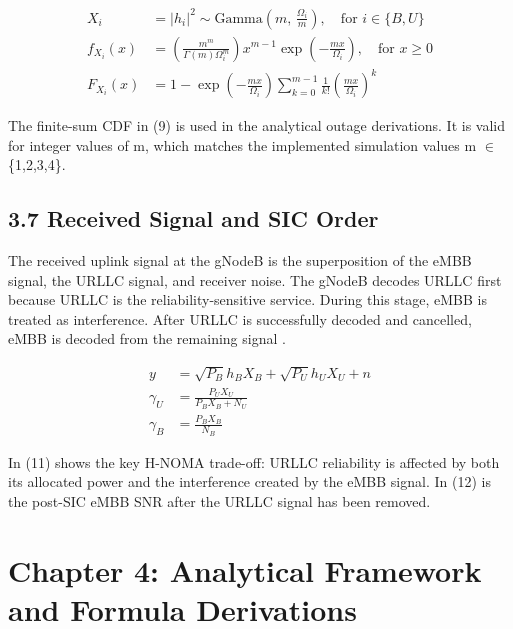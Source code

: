 \documentclass[
]{article}
\begin{document}
\begin{align}
X_{i} &= |h_{i}|^{2} \sim \text {Gamma}\left( m,\, \frac{\Omega_{i}}{m} \right), \quad \text{for } i \in \{B,U\} \\[1ex]
f_{X_{i}}(x) &= \left( \frac{m^{m}}{\Gamma(m)\Omega_{i}^{m}} \right) x^{m - 1} \exp\left( -\frac{mx}{\Omega_{i}} \right), \quad \text{for } x \geq 0 \\[1ex]
F_{X_{i}}(x) &= 1 - \exp\left( -\frac{mx}{\Omega_{i}} \right) \sum_{k = 0}^{m - 1} \frac{1}{k!} \left( \frac{mx}{\Omega_{i}} \right)^{k}
\end{align}

The finite-sum CDF in (9) is used in the analytical outage
derivations. It is valid for integer values of m, which matches the
implemented simulation values m \(∈\) \{1,2,3,4\}.

\subsection{3.7 Received Signal and SIC
Order}\label{received-signal-and-sic-order}

The received uplink signal at the gNodeB is the superposition of the
eMBB signal, the URLLC signal, and receiver noise. The gNodeB decodes
URLLC first because URLLC is the reliability-sensitive service. During
this stage, eMBB is treated as interference. After URLLC is successfully
decoded and cancelled, eMBB is decoded from the remaining signal \parencite{Tominaga2021}.

\begin{align}
y &= \sqrt{P_{B}} h_{B} X_{B} + \sqrt{P_{U}} h_{U} X_{U} + n \\[1ex]
\gamma_{U} &= \frac{P_{U} X_{U}}{P_{B} X_{B} + N_{U}} \\[1ex]
\gamma_{B} &= \frac{P_{B} X_{B}}{N_{B}}
\end{align}

In (11) shows the key H-NOMA trade-off: URLLC reliability is
affected by both its allocated power and the interference created by the
eMBB signal. In (12) is the post-SIC eMBB SNR after the URLLC
signal has been removed.

\clearpage

\section{Chapter 4: Analytical Framework and Formula
Derivations}\label{chapter-4-analytical-framework-and-formula-derivations}
\end{document}

